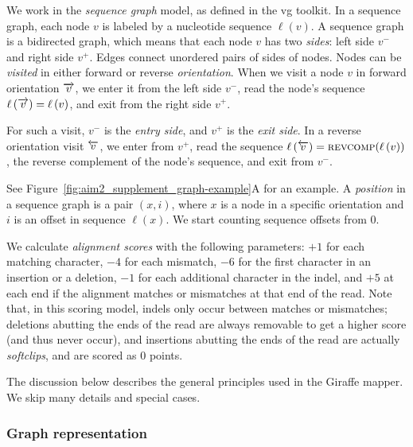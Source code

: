 \documentclass[11pt]{ucscthesis}
\newcommand{\nodelabel}[1]{\ensuremath{\ell\left( #1 \right)}}
\newcommand{\leftside}[1]{\ensuremath{{ #1 }^{-}}}
\newcommand{\rightside}[1]{\ensuremath{{ #1 }^{+}}}
\newcommand{\forwardnode}[1]{\ensuremath{\protect\overrightarrow{ #1 }}}
\newcommand{\reversenode}[1]{\ensuremath{\protect\overleftarrow{ #1 }}}
\newcommand{\reversecomplement}[1]{\ensuremath{\textsc{revcomp}({ #1 })}}
\newcommand{\vocab}[1]{\emph{#1}}
\begin{document}
We work in the \vocab{sequence graph} model, as defined in the vg toolkit\cite{garrison_variation_2018}.
In a sequence graph, each node $v$ is labeled by a nucleotide sequence $\nodelabel{v}$.
A sequence graph is a bidirected graph, which means that each node $v$ has two \vocab{sides}: left side $\leftside{v}$ and right side $\rightside{v}$.
Edges connect unordered pairs of sides of nodes.
Nodes can be \vocab{visited} in either forward or reverse \vocab{orientation}.
When we visit a node $v$ in forward orientation $\forwardnode{v}$, we enter it from the left side $\leftside{v}$, read the node's sequence $\nodelabel{\forwardnode{v}} = \nodelabel{v}$, and exit from the right side $\rightside{v}$.

For such a visit, $\leftside{v}$ is the \vocab{entry side}, and $\rightside{v}$ is the \vocab{exit side}.
In a reverse orientation visit $\reversenode{v}$, we enter from $\rightside{v}$, read the sequence $\nodelabel{\reversenode{v}} = \reversecomplement{\nodelabel{v}}$, the reverse complement of the node's sequence, and exit from $\leftside{v}$.
\ifdefined\HCode
    \par
\fi
See Figure~\ref{fig:aim2_supplement_graph-example}A for an example.
A \vocab{position} in a sequence graph is a pair $(x, i)$, where $x$ is a node in a specific orientation and $i$ is an offset in sequence $\nodelabel{x}$.
We start counting sequence offsets from $0$.

We calculate \vocab{alignment scores} with the following parameters: $+1$ for each matching character, $-4$ for each mismatch, $-6$ for the first character in an insertion or a deletion, $-1$ for each additional character in the indel, and $+5$ at each end if the alignment matches or mismatches at that end of the read.
Note that, in this scoring model, indels only occur between matches or mismatches; deletions abutting the ends of the read are always removable to get a higher score (and thus never occur), and insertions abutting the ends of the read are actually \vocab{softclips}, and are scored as 0 points.

The discussion below describes the general principles used in the Giraffe mapper.
We skip many details and special cases.



\subsubsection{Graph representation}
\end{document}
